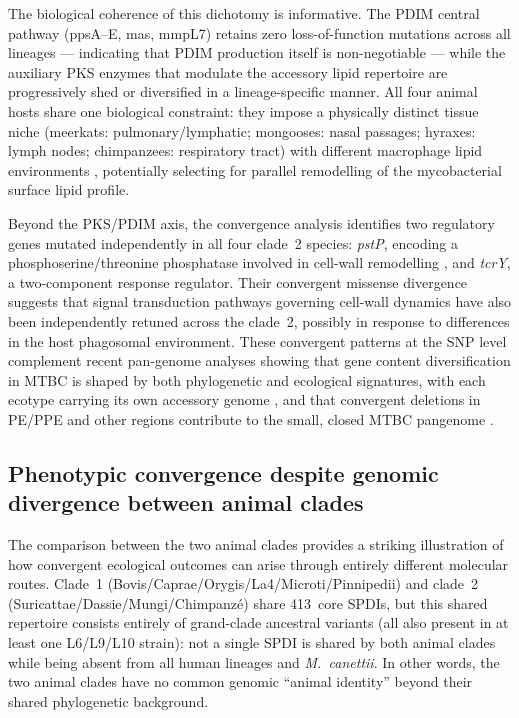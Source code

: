\documentclass[11pt,a4paper]{article}
\begin{document}
The biological coherence of this dichotomy is informative.
%
The PDIM central pathway (ppsA--E, mas, mmpL7) retains zero loss-of-function
mutations across all lineages --- indicating that PDIM production itself is
non-negotiable --- while the auxiliary PKS enzymes that modulate the accessory
lipid repertoire are progressively shed or diversified in a lineage-specific
manner.
%
All four animal hosts share one biological constraint: they impose a physically
distinct tissue niche (meerkats: pulmonary/lymphatic; mongooses: nasal passages;
hyraxes: lymph nodes; chimpanzees: respiratory tract) with different macrophage
lipid environments \cite{Boritsch2016}, potentially selecting for parallel
remodelling of the mycobacterial surface lipid profile.

Beyond the PKS/PDIM axis, the convergence analysis identifies two regulatory
genes mutated independently in all four clade~2 species: \textit{pstP}, encoding
a phosphoserine/threonine phosphatase involved in cell-wall remodelling
\cite{Chopra2003}, and \textit{tcrY}, a two-component response regulator.
%
Their convergent missense divergence suggests that signal transduction pathways
governing cell-wall dynamics have also been independently retuned across the
clade~2, possibly in response to differences in the host phagosomal
environment.
%
These convergent patterns at the SNP level complement recent pan-genome analyses
showing that gene content diversification in MTBC is shaped by both phylogenetic
and ecological signatures, with each ecotype carrying its own accessory genome
\cite{Zwyer2024}, and that convergent deletions in PE/PPE and other regions
contribute to the small, closed MTBC pangenome \cite{Orgeur2025}.

\subsection{Phenotypic convergence despite genomic divergence between animal clades}
\label{sec:disc:inter_clade}

The comparison between the two animal clades provides a striking illustration
of how convergent ecological outcomes can arise through entirely different
molecular routes.
%
Clade~1 (Bovis/Caprae/Orygis/La4/Microti/Pinnipedii) and clade~2
(Suricattae/Dassie/Mungi/Chimpanzé) share 413~core SPDIs, but this shared
repertoire consists entirely of grand-clade ancestral variants (all also present
in at least one L6/L9/L10 strain): not a single SPDI is shared by both animal
clades while being absent from all human lineages and \textit{M.~canettii}.
%
In other words, the two animal clades have no common genomic ``animal identity''
beyond their shared phylogenetic background.
\end{document}
